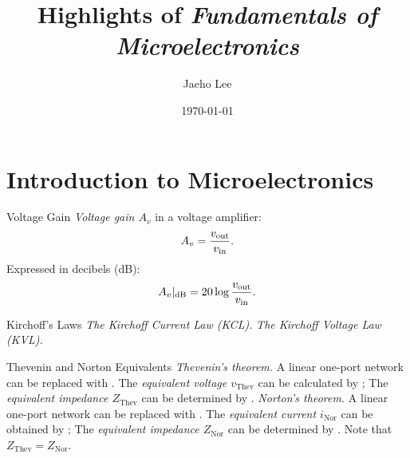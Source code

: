 \documentclass[testmode]{highlights}
\title{Highlights of \textit{Fundamentals of Microelectronics}}
\author{Jaeho Lee}
\date{\today}
\begin{document}
\maketitle

\section{Introduction to Microelectronics}
\begin{concept}{Voltage Gain}
  \emph{Voltage gain $A_v$} in a voltage amplifier:
  \begin{equation}
    A_v = \memorize{\frac{v_\mathrm{out}}{v_\mathrm{in}}}.
  \end{equation}
  Expressed in decibels (dB):
  \begin{equation}
    A_v|_{\mathrm{dB}} = \memorize{20 \log \frac{v_\mathrm{out}}{v_\mathrm{in}}}.
  \end{equation}
\end{concept}

\begin{concept}{Kirchoff's Laws}
  \emph{The Kirchoff Current Law (KCL).} 
  \tcbline
  \emph{The Kirchoff Voltage Law (KVL).} 
\end{concept}

\begin{concept}{Thevenin and Norton Equivalents}
  \emph{Thevenin's theorem.} A linear one-port network can be replaced with .
  The \emph{equivalent voltage $v_\mathrm{Thev}$} can be calculated by ;
  The \emph{equivalent impedance $Z_\mathrm{Thev}$} can be determined by .
  \tcbline
  \emph{Norton's theorem.} A linear one-port network can be replaced with .
  The \emph{equivalent current $i_\mathrm{Nor}$} can be obtained by ;
  The \emph{equivalent impedance $Z_\mathrm{Nor}$} can be determined by .
  \tcbline
  Note that $Z_\mathrm{Thev} = Z_\mathrm{Nor}$.
\end{concept}
\end{document}

